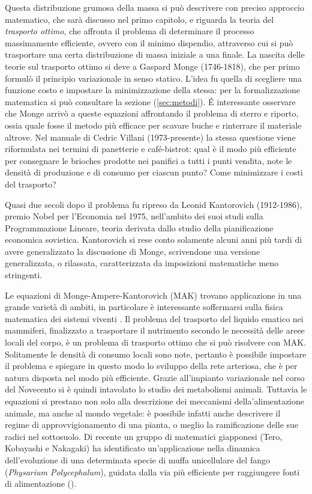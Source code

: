 Questa distribuzione grumosa della massa si può descrivere con preciso approccio matematico, che sarà discusso nel primo capitolo,
e riguarda la teoria del \textit{trasporto ottimo}, che affronta il problema di determinare il processo massimamente
efficiente, ovvero con il minimo dispendio, attraverso cui si può trasportare una certa distribuzione di massa iniziale a una 
finale. La nascita delle teorie sul trasporto ottimo si deve a Gaspard Monge (1746-1818), che per primo formulò il principio
variazionale in senso statico. L'idea fu quella di scegliere una funzione costo e impostare la minimizzazione della stessa: 
per la formalizzazione matematica si può consultare la sezione (\ref{sec:metodi}). \'E interessante osservare che Monge 
arrivò a queste equazioni affrontando il problema di sterro e riporto, ossia quale fosse il metodo più efficace per scavare buche
e rinterrare il materiale altrove. Nel manuale di Cedric Villani (1973-presente) la stessa questione viene riformulata nei termini
di panetterie e café-bistrot: qual è il modo più efficiente per consegnare le brioches prodotte nei panifici a tutti i punti vendita,
note le densità di produzione e di consumo per ciascun punto? Come minimizzare i costi del trasporto?

Quasi due secoli dopo il problema fu ripreso da Leonid Kantorovich (1912-1986), premio Nobel per l'Economia nel 1975, nell'ambito 
dei suoi studi sulla Programmazione Lineare, teoria derivata dallo studio della pianificazione economica sovietica. Kantorovich si
rese conto solamente alcuni anni più tardi di avere generalizzato la discussione di Monge, scrivendone una versione generalizzata,
o rilassata, caratterizzata da imposizioni matematiche meno stringenti.

Le equazioni di Monge-Ampere-Kantorovich (MAK) trovano applicazione in una grande varietà di ambiti, in particolare è interessante 
soffermarsi sulla fisica matematica dei sistemi viventi \cite{cardin}. Il problema del trasporto del liquido ematico nei mammiferi,
finalizzato a trasportare il nutrimento secondo le necessità delle areee locali del corpo, è un problema di trasporto
ottimo che si può risolvere con MAK. Solitamente le densità di consumo locali sono note, pertanto è possibile impostare
il problema e spiegare in questo modo lo sviluppo della rete arteriosa, che è per natura disposta nel modo più efficiente.
Grazie all'impianto variazionale nel corso del Novecento si è quindi intavolato lo studio dei metabolismi animali.
Tuttavia le equazioni si prestano non solo alla descrizione dei meccanismi della'alimentazione animale, ma anche al
mondo vegetale: è possibile infatti anche descrivere il regime di approvvigionamento di una pianta, o meglio 
la ramificazione delle sue radici nel sottosuolo.
Di recente un gruppo di matematici giapponesi (Tero, Kobayashi e Nakagaki) ha identificato un'applicazione nella
dinamica dell'evoluzione di una determinata specie di muffa unicellulare del fango (\textit{Physarium Polycephalum}),
guidata dalla via più efficiente per raggiungere fonti di alimentazione (\cite{yamada}).

